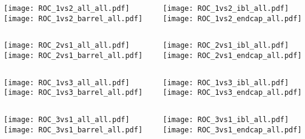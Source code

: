 \documentclass{beamer}
\begin{document}
\begin{frame}
\begin{columns}
\begin{column}{0.45\textwidth}
\texttt{[image: ROC\_1vs2\_all\_all.pdf]} \\ \vfill
\texttt{[image: ROC\_1vs2\_barrel\_all.pdf]}
\end{column}
\begin{column}{0.45\textwidth}
\texttt{[image: ROC\_1vs2\_ibl\_all.pdf]} \\ \vfill
\texttt{[image: ROC\_1vs2\_endcap\_all.pdf]}
\end{column}
\end{columns}
\end{frame}
\begin{frame}
\begin{columns}
\begin{column}{0.45\textwidth}
\texttt{[image: ROC\_2vs1\_all\_all.pdf]} \\ \vfill
\texttt{[image: ROC\_2vs1\_barrel\_all.pdf]}
\end{column}
\begin{column}{0.45\textwidth}
\texttt{[image: ROC\_2vs1\_ibl\_all.pdf]} \\ \vfill
\texttt{[image: ROC\_2vs1\_endcap\_all.pdf]}
\end{column}
\end{columns}
\end{frame}
\begin{frame}
\begin{columns}
\begin{column}{0.45\textwidth}
\texttt{[image: ROC\_1vs3\_all\_all.pdf]} \\ \vfill
\texttt{[image: ROC\_1vs3\_barrel\_all.pdf]}
\end{column}
\begin{column}{0.45\textwidth}
\texttt{[image: ROC\_1vs3\_ibl\_all.pdf]} \\ \vfill
\texttt{[image: ROC\_1vs3\_endcap\_all.pdf]}
\end{column}
\end{columns}
\end{frame}
\begin{frame}
\begin{columns}
\begin{column}{0.45\textwidth}
\texttt{[image: ROC\_3vs1\_all\_all.pdf]} \\ \vfill
\texttt{[image: ROC\_3vs1\_barrel\_all.pdf]}
\end{column}
\begin{column}{0.45\textwidth}
\texttt{[image: ROC\_3vs1\_ibl\_all.pdf]} \\ \vfill
\texttt{[image: ROC\_3vs1\_endcap\_all.pdf]}
\end{column}
\end{columns}
\end{frame}
\end{document}
